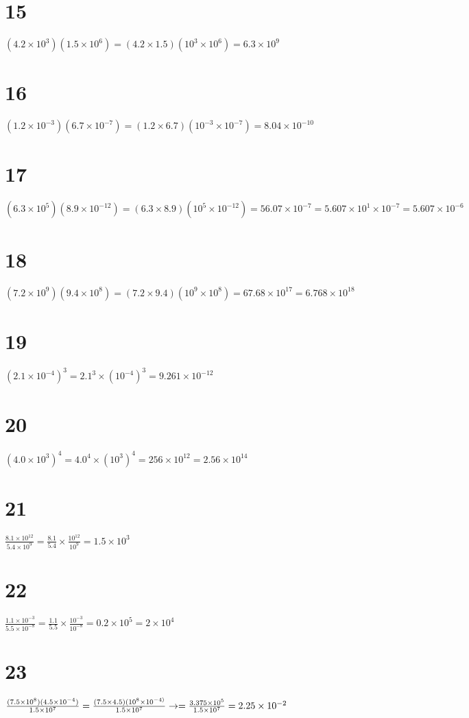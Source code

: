 \documentclass{article}
\theoremstyle{definition}
\begin{document}
\section*{15}
$(4.2\times 10^3)(1.5\times 10^6)=(4.2\times 1.5)(10^3\times 10^6)=6.3\times 10^9$

\section*{16}
$(1.2\times 10^{-3})(6.7\times 10^{-7})=(1.2\times 6.7)(10^{-3}\times 10^{-7})=8.04\times 10^{-10}$

\section*{17}
$(6.3\times 10^5)(8.9\times 10^{-12})=(6.3\times 8.9)(10^5\times 10^{-12})=56.07\times 10^{-7}=5.607\times 10^1\times 10^{-7}=5.607\times 10^{-6}$

\section*{18}
$(7.2\times 10^9)(9.4\times 10^8)=(7.2\times 9.4)(10^9\times 10^8)=67.68\times 10^{17}=6.768\times 10^{18}$

\section*{19}
$(2.1\times 10^{-4})^3=2.1^3\times (10^{-4})^3=9.261\times 10^{-12}$

\section*{20}
$(4.0\times 10^3)^4=4.0^4\times (10^3)^4=256\times 10^{12}=2.56\times 10^{14}$

\section*{21}
$\frac{8.1\times 10^{12}}{5.4\times 10^9}=\frac{8.1}{5.4}\times \frac{10^{12}}{10^9}=1.5\times 10^3$

\section*{22}
$\frac{1.1\times 10^{-3}}{5.5\times 10^{-8}}=\frac{1.1}{5.5}\times \frac{10^{-3}}{10^{-8}}=0.2\times 10^5=2\times 10^4$

\section*{23}
$\frac{(7.5\times 10^8)(4.5\times 10^{-4})}{1.5\times 10^7}=\frac{(7.5\times 4.5)(10^8\times 10^{-4)}}{1.5\times 10^7}\newline\rightarrow 
=\frac{3.375\times 10^5}{1.5\times 10^7}=2.25\times 10^{-2}$
\end{document}
